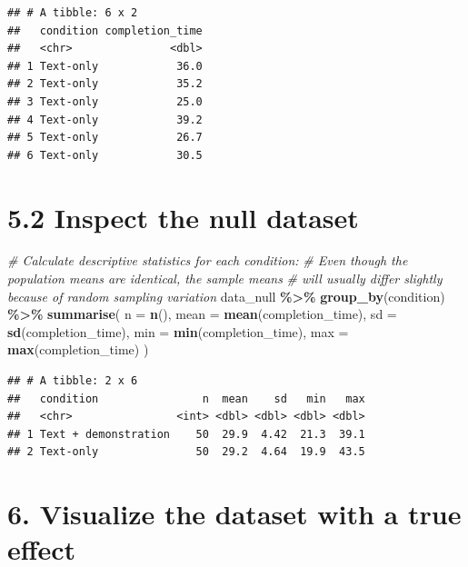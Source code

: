 \documentclass[
]{article}
\newenvironment{Shaded}{\begin{snugshade}}{\end{snugshade}}
\newcommand{\AttributeTok}[1]{\textcolor[rgb]{0.13,0.29,0.53}{#1}}
\newcommand{\CommentTok}[1]{\textcolor[rgb]{0.56,0.35,0.01}{\textit{#1}}}
\newcommand{\FunctionTok}[1]{\textcolor[rgb]{0.13,0.29,0.53}{\textbf{#1}}}
\newcommand{\NormalTok}[1]{#1}
\newcommand{\SpecialCharTok}[1]{\textcolor[rgb]{0.81,0.36,0.00}{\textbf{#1}}}
\begin{document}
\begin{verbatim}
## # A tibble: 6 x 2
##   condition completion_time
##   <chr>               <dbl>
## 1 Text-only            36.0
## 2 Text-only            35.2
## 3 Text-only            25.0
## 4 Text-only            39.2
## 5 Text-only            26.7
## 6 Text-only            30.5
\end{verbatim}

\section{5.2 Inspect the null dataset}\label{inspect-the-null-dataset}

\begin{Shaded}
\begin{Highlighting}[]
\CommentTok{\# Calculate descriptive statistics for each condition:}
\CommentTok{\# Even though the population means are identical, the sample means}
\CommentTok{\# will usually differ slightly because of random sampling variation}
\NormalTok{data\_null }\SpecialCharTok{\%\textgreater{}\%}
  \FunctionTok{group\_by}\NormalTok{(condition) }\SpecialCharTok{\%\textgreater{}\%}
  \FunctionTok{summarise}\NormalTok{(}
    \AttributeTok{n =} \FunctionTok{n}\NormalTok{(),}
    \AttributeTok{mean =} \FunctionTok{mean}\NormalTok{(completion\_time),}
    \AttributeTok{sd =} \FunctionTok{sd}\NormalTok{(completion\_time),}
    \AttributeTok{min =} \FunctionTok{min}\NormalTok{(completion\_time),}
    \AttributeTok{max =} \FunctionTok{max}\NormalTok{(completion\_time)}
\NormalTok{  )}
\end{Highlighting}
\end{Shaded}

\begin{verbatim}
## # A tibble: 2 x 6
##   condition                n  mean    sd   min   max
##   <chr>                <int> <dbl> <dbl> <dbl> <dbl>
## 1 Text + demonstration    50  29.9  4.42  21.3  39.1
## 2 Text-only               50  29.2  4.64  19.9  43.5
\end{verbatim}

\section{6. Visualize the dataset with a true
effect}\label{visualize-the-dataset-with-a-true-effect}
\end{document}
